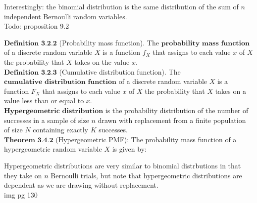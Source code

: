 \documentclass{article}
\begin{document}
    Interestingly: the binomial distribution is the same distribution of the sum of $n$ independent Bernoulli random variables. \\

    Todo: proposition 9.2

    $\textbf{Definition 3.2.2}$ (Probability mass function). The $\textbf{probability mass function}$ of a discrete random variable $X$ is a function $f_X$ that assigns to each value $x$ of $X$ the probability that $X$ takes on the value $x$.\\

    $\textbf{Definition 3.2.3}$ (Cumulative distribution function). The $\textbf{cumulative distribution function}$ of a discrete random variable $X$ is a function $F_X$ that assigns to each value $x$ of $X$ the probability that $X$ takes on a value less than or equal to $x$.\\

    $\textbf{Hypergeometric distribution}$ is the probability distribution of the number of successes in a sample of size $n$ drawn with replacement from a finite population of size $N$ containing exactly $K$ successes.\\

    $\textbf{Theorem 3.4.2}$ (Hypergeometric PMF): The probability mass function of a hypergeometric random variable $X$ is given by:

    Hypergeometric distributions are very similar to binomial distrbutions in that they take on $n$ Bernoulli trials, but note that hypergeometric distributions are dependent as we are drawing without replacement.\\


    img pg 130
\end{document}
